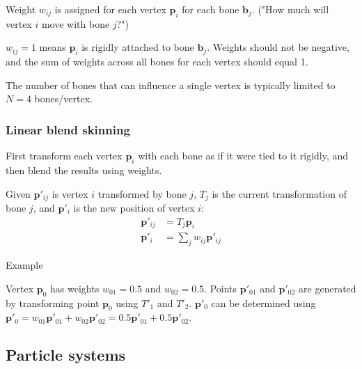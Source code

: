 \documentclass[12pt]{article}
\begin{document}
Weight $w_{ij}$ is assigned for each vertex $\bm p_i$ for each
bone $\bm b_j$. ("How much will vertex $i$ move with bone $j$?")

$w_{ij} = 1$ means $\bm p_i$ is rigidly attached to bone $\bm b_j$.
Weights should not be negative, and the sum of weights across
all bones for each vertex should equal 1.

The number of bones that can influence a single vertex is typically
limited to $N = 4$ bones/vertex.

\subsubsection{Linear blend skinning}

First transform each vertex $\bm p_i$ with each bone as if it were
tied to it rigidly, and then blend the results using weights.

Given $\bm p'_{ij}$ is vertex $i$ transformed by bone $j$, $T_j$ is
the current transformation of bone $j$, and $\bm p'_i$ is the new
position of vertex $i$:
\begin{align*}
    \bm p'_{ij} &= T_j \bm p_i\\
    \bm p'_i &= \sum_j w_{ij} \bm p'_{ij}
\end{align*}

Example


Vertex $\bm p_0$ has weights $w_{01} = 0.5$ and $w_{02} = 0.5$. Points
$\bm p'_{01}$ and $\bm p'_{02}$ are generated by transforming point
$\bm p_0$ using $T'_1$ and $T'_2$. $\bm p'_0$ can be determined using
$\bm p'_0 = w_{01}\bm p'_{01} + w_{02}\bm p'_{02} = 0.5\bm p'_{01} + 0.5
\bm p'_{02}$.

\subsection{Particle systems}
\end{document}
